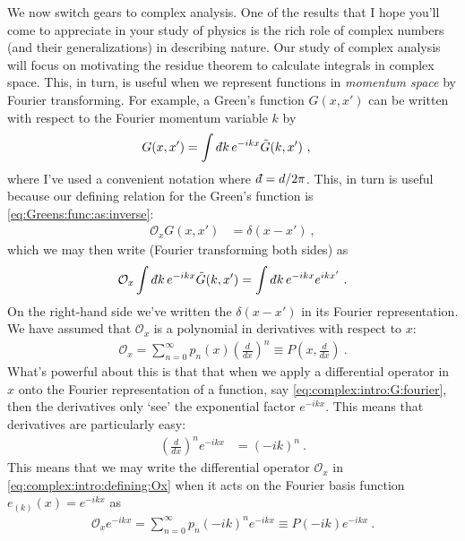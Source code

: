 \documentclass[
  11pt,
	colorful,
	raggedright,
]{tufte-style-thesis-flip}
\renewcommand{\dbar}{d\hspace*{-0.08em}\bar{}\hspace*{0.1em}}
\begin{document}
We now switch gears to complex analysis. One of the results that I hope you'll come to appreciate in your study of physics is the rich role of complex numbers (and their generalizations) in describing nature. Our study of complex analysis will focus on motivating the residue theorem to calculate integrals in complex space. This, in turn, is useful when we represent functions in \emph{momentum space} by Fourier transforming. For example, a Green's function $G(x,x')$ can be written with respect to the Fourier momentum variable $k$ by
\begin{align}
  G(x,x') &= \int \dbar k \, e^{-ikx} \tilde G(k,x') \ ,
  \label{eq:complex:intro:G:fourier}
\end{align}
where I've used a convenient notation where $\dbar = d/2\pi$. This, in turn is useful because our defining relation for the Green's function is \eqref{eq:Greens:func:as:inverse}:
\begin{align}
  \mathcal O_xG(x,x') &= \delta(x-x') \ ,
\end{align}
which we may then write (Fourier transforming both sides) as
\begin{align}
  \mathcal O_x \int \dbar k \, e^{-ikx} \tilde G(k,x') 
  =
  \int \dbar k \, e^{-ikx} e^{ikx'} \ .
  \label{eq:complex:intro:defining:G:}
\end{align}
On the right-hand side we've written the $\delta(x-x')$ in its Fourier representation. We have assumed that $\mathcal O_x$ is a polynomial in derivatives with respect to $x$:
\begin{align}
  \mathcal O_x = \sum_{n=0}^{\infty}
  p_n(x) \left(\frac{d}{dx}\right)^n
  \equiv P\left(x,\frac{d}{dx}\right) \ .
  \label{eq:complex:intro:defining:Ox}
\end{align}
What's powerful about this is that that when we apply a differential operator in $x$ onto the Fourier representation of a function, say \eqref{eq:complex:intro:G:fourier}, then the derivatives only `see' the exponential factor $e^{-ikx}$. This means that derivatives are particularly easy:
\begin{align}
  \left(\frac{d}{dx}\right)^n e^{-ikx} &= (-ik)^n \ .
\end{align}
This means that we may write the differential operator $\mathcal O_x$ in \eqref{eq:complex:intro:defining:Ox} when it acts on the Fourier basis function $e_{(k)}(x) = e^{-ikx}$ as
\begin{align}
  \mathcal O_x e^{-ikx} = \sum_{n=0}^{\infty}
  p_n \left(-ik\right)^n e^{-ikx}
  \equiv P(-ik) e^{-ikx}  \ .
\end{align}
\end{document}
